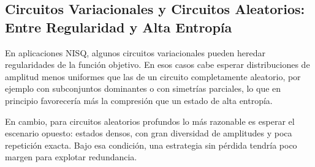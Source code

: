 \subsection{Circuitos Variacionales y Circuitos Aleatorios: Entre Regularidad y Alta Entropía}
\label{subsec:patrones_variacionales_aleatorios}

En aplicaciones NISQ, algunos circuitos variacionales pueden heredar regularidades de la función objetivo. En esos casos cabe esperar distribuciones de amplitud menos uniformes que las de un circuito completamente aleatorio, por ejemplo con subconjuntos dominantes o con simetrías parciales, lo que en principio favorecería más la compresión que un estado de alta entropía.

En cambio, para circuitos aleatorios profundos lo más razonable es esperar el escenario opuesto: estados densos, con gran diversidad de amplitudes y poca repetición exacta. Bajo esa condición, una estrategia sin pérdida tendría poco margen para explotar redundancia.

